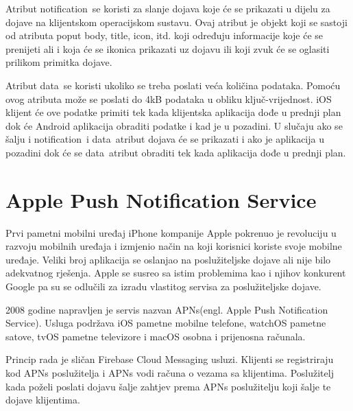 \documentclass[times, utf8, zavrsni]{fer}
\begin{document}
Atribut \glqq notification\grqq\  se koristi za slanje dojava koje će se prikazati u dijelu za dojave na klijentskom operacijskom sustavu. Ovaj atribut je objekt koji se sastoji od atributa poput \glqq body\grqq , \glqq title\grqq , \glqq icon\grqq , itd. koji određuju informacije koje će se prenijeti ali i koja će se ikonica prikazati uz dojavu ili koji zvuk će se oglasiti prilikom primitka dojave.

Atribut \glqq data\grqq\  se koristi ukoliko se treba poslati veća količina podataka. Pomoću ovog atributa može se poslati do 4kB podataka u obliku ključ-vrijednost. iOS klijent će ove podatke primiti tek kada klijentska aplikacija dođe u prednji plan dok će Android aplikacija obraditi podatke i kad je u pozadini. U slučaju ako se šalju i \glqq notification\grqq\  i \glqq data\grqq\  atribut dojava će se prikazati i ako je aplikacija u pozadini dok će se \glqq data\grqq\  atribut obraditi tek kada aplikacija dođe u prednji plan.

\section{Apple Push Notification Service}

Prvi pametni mobilni uređaj iPhone kompanije Apple pokrenuo je revoluciju u razvoju mobilnih uređaja i izmjenio način na koji korisnici koriste svoje mobilne uređaje. Veliki broj aplikacija se oslanjao na poslužiteljske dojave ali nije bilo adekvatnog rješenja. Apple se susreo sa istim problemima kao i njihov konkurent Google pa su se odlučili za izradu vlastitog servisa za poslužiteljske dojave.

2008 godine napravljen je servis nazvan APNs(engl. Apple Push Notification Service). Usluga podržava iOS pametne mobilne telefone, watchOS pametne satove, tvOS pametne televizore i macOS osobna i prijenosna računala.

Princip rada je sličan Firebase Cloud Messaging usluzi. Klijenti se registriraju kod APNs poslužitelja i APNs vodi računa o vezama sa klijentima. Poslužitelj kada poželi poslati dojavu šalje zahtjev prema APNs poslužitelju koji šalje te dojave klijentima.
\end{document}
